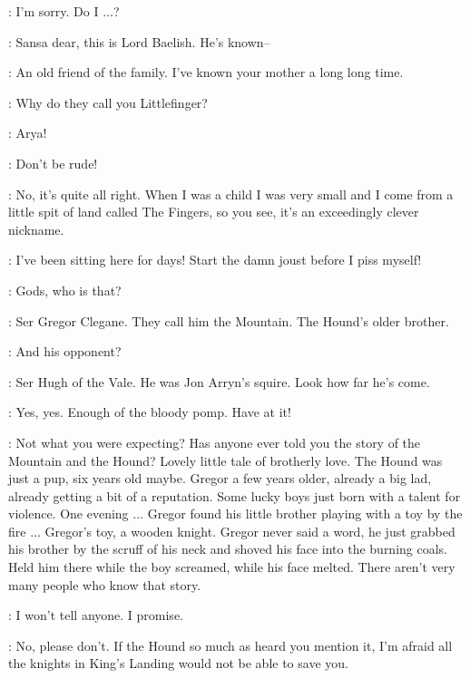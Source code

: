 \SANSA: I'm sorry. Do I $\ldots$? 

\SEPTAMORDANE: Sansa dear, this is Lord Baelish. He's known--

\LITTLEFINGER: An old friend of the family. I've known your mother a long long time. 

\ARYA: Why do they call you Littlefinger? 

\SANSA: Arya! 

\SEPTAMORDANE: Don't be rude! 

\LITTLEFINGER: No, it's quite all right. When I was a child I was very small and I come from a little spit of land called The Fingers, so you see, it's an exceedingly clever nickname. 

\ROBERT: I've been sitting here for days! Start the damn joust before I piss myself! 


\SANSA: Gods, who is that? 

\LITTLEFINGER: Ser Gregor Clegane. They call him the Mountain. The Hound's older brother. 

\SANSA: And his opponent? 

\LITTLEFINGER: Ser Hugh of the Vale. He was Jon Arryn's squire. Look how far he's come. 

\ROBERT: Yes, yes. Enough of the bloody pomp. Have at it! 


\LITTLEFINGER: Not what you were expecting? Has anyone ever told you the story of the Mountain and the Hound? Lovely little tale of brotherly love. The Hound was just a pup, six years old maybe. Gregor a few years older, already a big lad, already getting a bit of a reputation. Some lucky boys just born with a talent for violence. One evening $\ldots$ Gregor found his little brother playing with a toy by the fire $\ldots$ Gregor's toy, a wooden knight. Gregor never said a word, he just grabbed his brother by the scruff of his neck and shoved his face into the burning coals. Held him there while the boy screamed, while his face melted. There aren't very many people who know that story. 

\SANSA: I won't tell anyone. I promise. 

\LITTLEFINGER: No, please don't. If the Hound so much as heard you mention it, I'm afraid all the knights in King's Landing would not be able to save you. 

